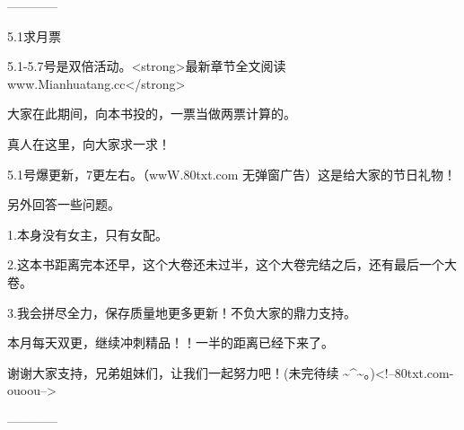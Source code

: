 \begin{this_body}
------------

5.1求月票

5.1-5.7号是双倍活动。<strong>最新章节全文阅读www.Mianhuatang.cc</strong>

大家在此期间，向本书投的，一票当做两票计算的。

真人在这里，向大家求一求！

5.1号爆更新，7更左右。（wwW.80txt.com 无弹窗广告）这是给大家的节日礼物！

另外回答一些问题。

1.本身没有女主，只有女配。

2.这本书距离完本还早，这个大卷还未过半，这个大卷完结之后，还有最后一个大卷。

3.我会拼尽全力，保存质量地更多更新！不负大家的鼎力支持。

本月每天双更，继续冲刺精品！！一半的距离已经下来了。

谢谢大家支持，兄弟姐妹们，让我们一起努力吧！(未完待续 \~{}\^{}\~{}。)<!--80txt.com-ouoou-->

------------

\end{this_body}

